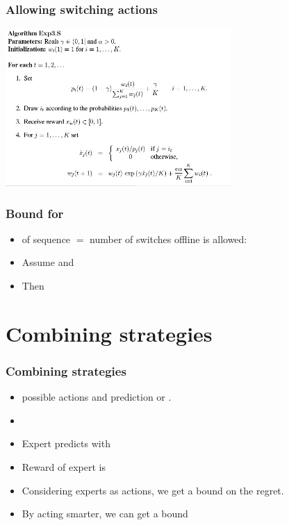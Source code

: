\documentclass[handout]{beamer}
\begin{document}
\begin{frame}
\frametitle{Allowing switching actions}
\includegraphics[height=6cm]{figures/Exp3-S.jpg}
\end{frame}

\begin{frame}
\frametitle{Bound for }
\begin{itemize}
\item {} of sequence $=$ number of switches offline is allowed:
\item  Assume  and
\item Then

\end{itemize}
\end{frame}

\section{Combining strategies}

\begin{frame}
\frametitle{Combining strategies}
\begin{itemize}
\item {} possible actions and  prediction  or .

\item {}
\item Expert  predicts with  
\item Reward of expert  is 
\item Considering experts as actions, we get a bound 
 on the regret.
\item By acting smarter, we can get a bound 
\end{itemize}
\end{frame}
\end{document}
